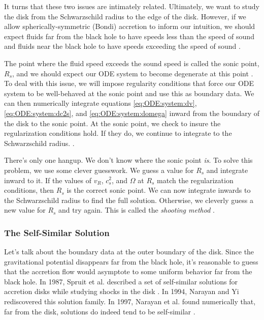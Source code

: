 \documentclass[]{article}
\begin{document}
It turns that these two issues are intimately related. Ultimately, we
want to study the disk from the Schwarzschild radius to the edge of
the disk. However, if we allow spherically-symmetric (Bondi) accretion
to inform our intuition, we should expect fluids far from the black
hole to have speeds less than the speed of sound and fluids near the
black hole to have speeds exceeding the speed of sound
\cite{Frank,PadmanabhanTA,Melia}. 

The point where the fluid speed exceeds the sound speed is called the
sonic point, $R_s$, and we should expect our ODE system to become
degenerate at this point
\cite{Shafee08,Frank,PadmanabhanTA,Melia,Narayan97}. To deal with this
issue, we will impose regularity conditions that force our ODE system
to be well-behaved at the sonic point and use this as boundary data. We
can then numerically integrate equations \eqref{eq:ODE:system:dv},
\eqref{eq:ODE:system:dc2s}, and \eqref{eq:ODE:system:domega} inward from the boundary of the disk to the sonic point. At the sonic point, we check to insure the regularization conditions hold. If they do, we continue to integrate to the Schwarzschild radius. \cite{Shafee08}.

There's only one hangup. We don't know where the sonic point
\textit{is}. To solve this problem, we use some clever guesswork. We
guess a value for $R_s$ and integrate inward to it. If the values of
$v_R$, $c_s^2$, and $\Omega$ at $R_s$ match the regularization
conditions, then $R_s$ is the correct sonic point. We can now
integrate inwards to the Schwarzschild radius to find the full
solution. Otherwise, we cleverly guess a new value for $R_s$ and try
again. This is called the \textit{shooting method}
\cite{NumericalRecipes,Heath}.

\subsubsection{The Self-Similar Solution}
\label{subsubsec:self-similar}
Let's talk about the boundary data at the outer boundary of the
disk. Since the gravitational potential disappears far from the black
hole, it's reasonable to guess that the accretion flow would asymptote
to some uniform behavior far from the black hole. In 1987, Spruit et
al. described a set of self-similar solutions for accretion disks
while studying shocks in the disk \cite{Spruit87}. In 1994, Narayan
and Yi rediscovered this solution family. In 1997, Narayan et
al. found numerically that, far from the disk, solutions do indeed
tend to be self-similar \cite{Narayan97}.
\end{document}
